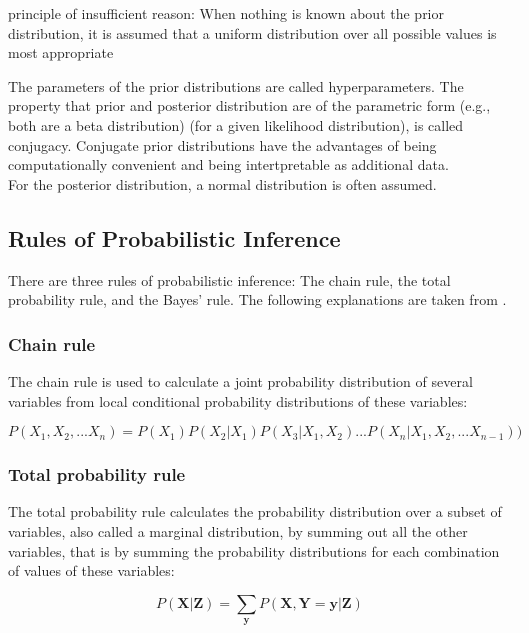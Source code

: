 \documentclass{article}
\begin{document}
principle of insufficient reason:
When nothing is known about the prior distribution, it is assumed that a uniform distribution over all possible values is most appropriate
\cite{1439840954}

The parameters of the prior distributions are called hyperparameters. The property that prior and posterior distribution are of the parametric form (e.g., both are a beta distribution) (for a given likelihood distribution), is called conjugacy. Conjugate prior distributions have the advantages of being computationally convenient and being intertpretable as additional data.
\\
For the posterior distribution, a normal distribution is often assumed.
\subsection{Rules of Probabilistic Inference}
There are three rules of probabilistic inference: The chain rule, the total probability rule, and the Bayes' rule. The following explanations are taken from \cite{9781617292330}.



\subsubsection{Chain rule}

The chain rule is used to calculate a \gls{joint probability distribution} of several variables from local \gls{conditional probability distribution}s of these variables:

\begin{equation}
  P(X_1 ,X_2 ,...X_n ) = P(X_1 )P(X_2 | X_1 )P(X_3 | X_1 ,X_2 )...P(X_n | X_1 ,X_2 ,...X_{n-1}) )
\end{equation}

\subsubsection{Total probability rule}

The total probability rule calculates the probability distribution over a subset of variables, also called a \gls{marginal distribution}, by summing out all the other variables, that is by summing the probability distributions for each combination of values of these variables:

\begin{equation}
P(\boldsymbol X |\boldsymbol Z ) = \sum_{\boldsymbol y}   P(\boldsymbol X ,\boldsymbol Y =\boldsymbol y |\boldsymbol Z )
\end{equation} 
\end{document}
